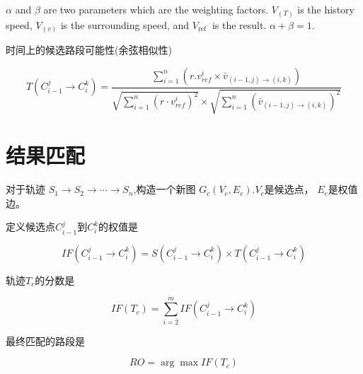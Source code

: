 $ \alpha $ and $ \beta $ are two parameters which are the weighting factors. $ V_{(T)} $ is the history speed, $ V_{(v)} $ is the surrounding speed, and $ V_{\text {ref }} $ is the result. $\alpha + \beta = 1$.

时间上的候选路段可能性(余弦相似性)

\begin{equation} T\left(C_{i-1}^{j} \rightarrow C_{i}^{k}\right)=\frac{\sum_{i=1}^{n}\left(r . v_{r e f}^{i} \times \bar{v}_{(i-1, j) \rightarrow(i, k)}\right)}{\sqrt{\sum_{i=1}^{n}\left(r \cdot v_{r e f}^{i}\right)^{2}} \times \sqrt{\sum_{i=1}^{n}\left(\bar{v}_{(i-1, j) \rightarrow(i, k)}\right)^{2}}} \end{equation}

\section{结果匹配}

对于轨迹 $ S_{1} \longrightarrow S_{2} \longrightarrow \cdots \longrightarrow S_{n} $,构造一个新图 $ G_{c}\left(V_{c}, E_{c}\right) $.$V_c$是候选点， $E_c$是权值边。

定义候选点$C_{i-1}^{j}$到$C_{i}^{k}$的权值是

\begin{equation} I F\left(C_{i-1}^{j} \rightarrow C_{i}^{k}\right)=S\left(C_{i-1}^{j} \rightarrow C_{i}^{k}\right) \times T\left(C_{i-1}^{j} \rightarrow C_{i}^{k}\right) \end{equation}

轨迹$T_c$的分数是

\begin{equation} I F\left(T_{c}\right)=\sum_{i=2}^{m} I F\left(C_{i-1}^{j} \rightarrow C_{i}^{k}\right) \end{equation}

最终匹配的路段是

\begin{equation}RO = \arg \max IF(T_c)\end{equation}